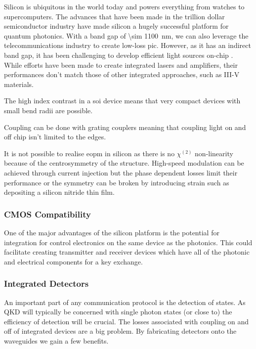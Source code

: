Silicon is ubiquitous in the world today and powers everything from watches to supercomputers. The advances that have been made in the trillion dollar semiconductor industry have made silicon a hugely successful platform for quantum photonics. With a band gap of \SI{\sim 1100}{nm}, we can also leverage the telecommunications industry to create low-loss \acl{pic}. However, as it has an indirect band gap, it has been challenging to develop efficient light sources on-chip \cite{}. While efforts have been made to create integrated lasers and amplifiers, their performances don't match those of other integrated approaches, such as III-V materials.

The high index contrast in a \ac{soi} device means that very compact devices with small bend radii are possible.

Coupling can be done with grating couplers meaning that coupling light on and off chip isn't limited to the edges.

It is not possible to realise \ac{eopm} in silicon as there is no $\chi^{(2)}$ non-linearity because of the centrosymmetry of the structure. High-speed modulation can be achieved through current injection but the phase dependent losses limit their performance \cite{} or the symmetry can be broken by introducing strain such as depositing a silicon nitride thin film.

\subsubsection*{CMOS Compatibility}

One of the major advantages of the silicon platform is the potential for integration for control electronics on the same device as the photonics. This could facilitate creating transmitter and receiver devices which have all of the photonic and electrical components for a key exchange. 

\subsubsection*{Integrated Detectors}

An important part of any communication protocol is the detection of states. As \ac{QKD} will typically be concerned with single photon states (or close to) the efficiency of detection will be crucial. The losses associated with coupling on and off of integrated devices are a big problem. By fabricating detectors onto the waveguides we gain a few benefits.

